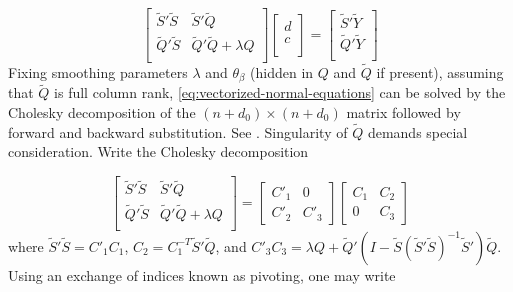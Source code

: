 \documentclass[12pt]{article}
\newcommand{\tildeS}{\tilde{S}}
\newcommand{\tildeY}{\tilde{Y}}
\newcommand{\tildeQ}{\tilde{Q}}
\theoremstyle{definition}
\begin{document}
\begin{equation} \label{eq:vectorized-normal-equations}
\begin{bmatrix}
\tildeS'\tildeS & \tildeS'\tildeQ \\
\tildeQ'\tildeS & \tildeQ'\tildeQ + \lambda Q\\
\end{bmatrix}
\begin{bmatrix}
d\\
c\\
\end{bmatrix}
= \begin{bmatrix}
\tildeS'\tildeY \\
 \tildeQ'\tildeY\\
\end{bmatrix}
\end{equation}
\bigskip
Fixing smoothing parameters $\lambda$ and $\theta_\beta$ (hidden in $Q$ and $\tildeQ$ if present), assuming that $\tildeQ$ is full column rank, \ref{eq:vectorized-normal-equations} can be solved by the Cholesky decomposition of the $\left( n + d_0 \right) \times \left( n + d_0 \right)$ matrix followed by forward and backward substitution. See \citet{golub2012matrix}. Singularity of $\tildeQ$ demands special consideration. Write the Cholesky decomposition

\begin{equation} \label{eq:normal-equation-cholesky}
\begin{bmatrix}
\tildeS'\tildeS & \tildeS'\tildeQ \\
\tildeQ'\tildeS & \tildeQ'\tildeQ + \lambda Q\\
\end{bmatrix}
= \begin{bmatrix}
C'_1 & 0 \\
C'_2  & C'_3 
\end{bmatrix}
\begin{bmatrix}
C_1 & C_2 \\
0  & C_3 
\end{bmatrix}
\end{equation}
\noindent
where $\tildeS'\tildeS = C'_1 C_1$, $C_2 = C_1^{-T} \tildeS' \tildeQ$, and $C'_3 C_3 = \lambda Q +  \tildeQ'\left( I - \tildeS\left( \tildeS' \tildeS \right)^{-1} \tildeS' \right)\tildeQ$. Using an exchange of indices known as pivoting, one may write 
\end{document}
